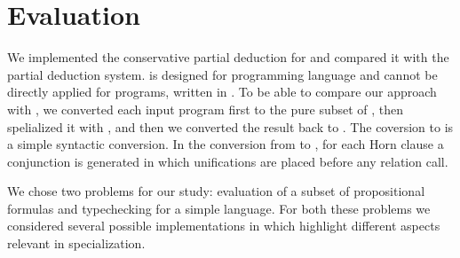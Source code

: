 \section{Evaluation}

We implemented the conservative partial deduction for \mk and compared it with the \ecce partial deduction system.
\ecce is designed for \pro programming language and cannot be directly applied for programs, written in \mk.
To be able to compare our approach with \ecce, we converted each input program first to the pure subset of \pro, then spelialized it with \ecce, and then we converted the result back to \mk.
The coversion to \pro is a simple syntactic conversion. In the conversion from \pro to \mk, for each Horn clause a conjunction is generated in which unifications are placed before any relation call.

We chose two problems for our study: evaluation of a subset of propositional formulas and typechecking for a simple language.
For both these problems we considered several possible implementations in \mk which highlight different aspects relevant in specialization.



